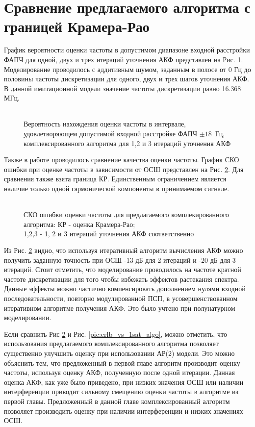 \section{Сравнение предлагаемого алгоритма с границей Крамера-Рао}
График вероятности оценки частоты в допустимом диапазоне входной расстройки ФАПЧ для одной, двух и трех итераций уточнения АКФ представлен на Рис. \ref{pic:ar_dma_probability}.
Моделирование проводилось с аддитивным шумом, заданным в полосе от 0 Гц до половины частоты дискретизации для одного, двух и трех шагов уточнения АКФ.
В данной имитационной модели значение частоты дискретизации равно 16.368 МГц.
\begin{figure}[h]
\center{}
	\caption{\\Вероятность нахождения оценки частоты в интервале, удовлетворяющем допустимой входной расстройке ФАПЧ \mbox{${\pm 18}$ Гц,} комплексированного алгоритма для 1,2 и 3 итераций уточнения АКФ}
	\label{pic:ar_dma_probability}
\end{figure}

Также в работе проводилось сравнение качества оценки частоты. График СКО ошибки при оценке частоты в зависимости от ОСШ представлен на Рис. \ref{pic:crlb_vs_algorithm}.
Для сравнения также взята граница КР.  Единственным ограничением является наличие только одной гармонической компоненты в принимаемом сигнале.
\begin{figure}[h]
\center{}
	\caption{\\СКО ошибки оценки частоты для предлагаемого комплекированного алгоритма: КР - оценка Крамера-Рао; \\1,2,3 - 1, 2 и 3 итераций уточнения АКФ соответственно}
	\label{pic:crlb_vs_algorithm}
\end{figure}
Из Рис. \ref{pic:crlb_vs_algorithm} видно, что используя итеративный алгоритм вычисления АКФ можно получить заданную точность
при ОСШ -13 дБ для 2 итераций и -20 дБ для 3 итераций. Стоит отметить, что моделирование проводилось на частоте кратной частоте дискретизации для
того чтобы избежать эффектов растекания спектра. Данные эффекты можно частично компенсировать дополнением нулями входной последовательности, повторно модулированной ПСП, в
усовершенствованном итеративном алгоритме получения АКФ. Это было учтено при полунатурном моделировании.

Если сравнить Рис \ref{pic:crlb_vs_algorithm} и Рис. \ref{pic:crlb_vs_1sat_algo}, можно отметить, что использования предлагаемого комплексированного алгоритма
позволяет существенно улучшить оценку при использовании АР(2) модели. Это можно объяснить тем, что предложенный в первой главе алгоритм производит оценку частоты, используя
оценку АКФ, полученную после одной итерации. Данная оценка АКФ, как уже было приведено, при низких значения ОСШ или наличии интерференции приводит сильному смещению оценки
частоты в алгоритме из первой главы. Предложенный в данной главе комплексированный алгоритм позволяет производить оценку при наличии интерференции и низких значениях ОСШ.


